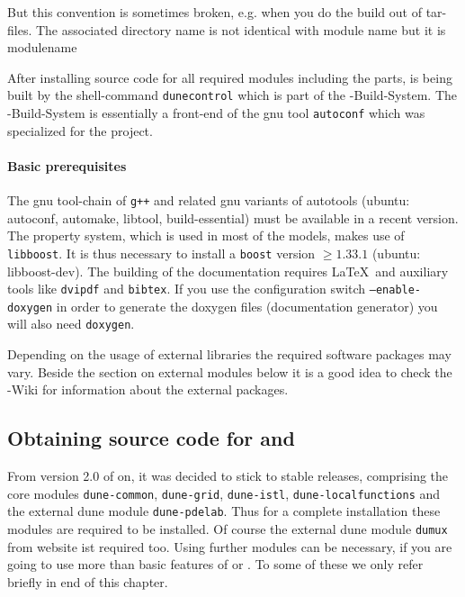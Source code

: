 But this convention is sometimes broken, e.g.
when you do the build out of tar-files. The associated directory name is not identical with module name but it is modulename


After installing source code for all required \Dune modules including the \Dumux parts, \Dune is being built by the shell-command \texttt{dunecontrol} which is part of the {\Dune}-Build-System. The {\Dune}-Build-System is essentially a front-end of the gnu tool \texttt{autoconf} which was specialized for the \Dune project.

\paragraph{Basic prerequisites} \label{prerequisites}
The gnu tool-chain of \texttt{g++}  and related gnu variants of autotools (ubuntu: autoconf, automake, libtool, build-essential) must be available in a recent version. 
The \Dumux property system, which is used in most of the models, makes use of \texttt{libboost}. 
It is thus necessary to install a  \texttt{boost}  version $\geqslant 1.33.1$ (ubuntu: libboost-dev). 
The building of the documentation requires \LaTeX\ and auxiliary tools like \texttt{dvipdf} and \texttt{bibtex}. 
If you use the configuration switch \texttt{--enable-doxygen} in order to generate the doxygen files (documentation generator) you will also need \texttt{doxygen}.

Depending on the usage of external libraries the required software packages may vary. 
Beside the section on external modules below it is a good idea to check the {\Dune}-Wiki \cite{DUNE-WIKI} for information about the external packages.

\subsection{Obtaining source code for \Dune and \Dumux}
From version 2.0 of \Dune on, it was decided to stick to stable \Dune releases, comprising the core modules 
\texttt{dune-common}, \texttt{dune-grid}, \texttt{dune-istl}, \texttt{dune-localfunctions} and the external dune module \texttt{dune-pdelab}. Thus for a complete \Dumux installation these modules are required to be installed. Of course the external dune module \texttt{dumux} from \Dumux website ist required too. Using further modules can be necessary, if you are going to use more than basic features of \Dune or \Dumux. To some of these we only refer briefly in end of this chapter.\\

